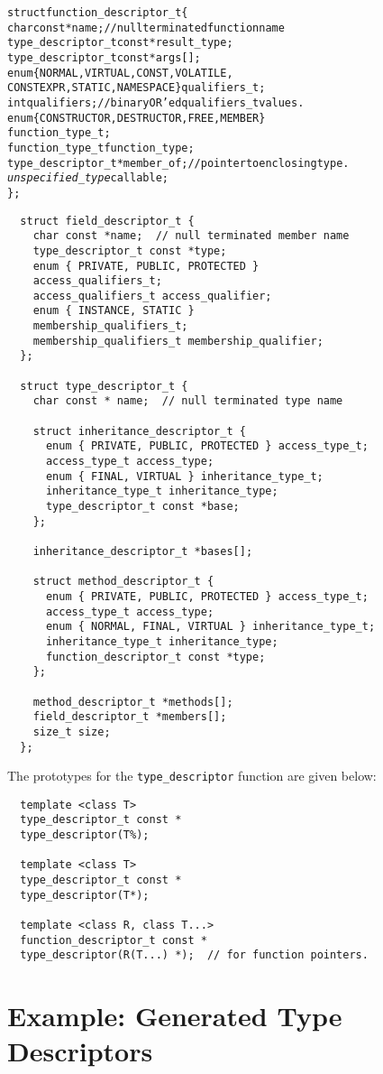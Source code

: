 \documentclass[10pt,a4paper]{article}
\begin{document}
\begin{alltt}
  struct function\_descriptor\_t \{
    char const *name;  // null terminated function name
    type\_descriptor\_t const *result\_type;
    type\_descriptor\_t const *args[];
    enum \{ NORMAL, VIRTUAL, CONST, VOLATILE,
           CONSTEXPR, STATIC, NAMESPACE \} qualifiers\_t;
    int qualifiers;  // binary OR’ed qualifiers\_t values.
    enum \{ CONSTRUCTOR, DESTRUCTOR, FREE, MEMBER \}
    function\_type\_t;
    function\_type\_t function\_type;
    type\_descriptor\_t *member\_of;  // pointer to enclosing type.
    \emph{unspecified\_type} callable;
  \};
\end{alltt}
\begin{verbatim}
  struct field_descriptor_t {
    char const *name;  // null terminated member name
    type_descriptor_t const *type;
    enum { PRIVATE, PUBLIC, PROTECTED }
    access_qualifiers_t;
    access_qualifiers_t access_qualifier;
    enum { INSTANCE, STATIC }
    membership_qualifiers_t;
    membership_qualifiers_t membership_qualifier;
  };

  struct type_descriptor_t {
    char const * name;  // null terminated type name

    struct inheritance_descriptor_t {
      enum { PRIVATE, PUBLIC, PROTECTED } access_type_t;
      access_type_t access_type;
      enum { FINAL, VIRTUAL } inheritance_type_t;
      inheritance_type_t inheritance_type;
      type_descriptor_t const *base;
    };

    inheritance_descriptor_t *bases[];

    struct method_descriptor_t {
      enum { PRIVATE, PUBLIC, PROTECTED } access_type_t;
      access_type_t access_type;
      enum { NORMAL, FINAL, VIRTUAL } inheritance_type_t;
      inheritance_type_t inheritance_type;
      function_descriptor_t const *type;
    };

    method_descriptor_t *methods[];
    field_descriptor_t *members[];
    size_t size;
  };
\end{verbatim}

The prototypes for the \verb+type_descriptor+ function are given below:

\begin{verbatim}
  template <class T>
  type_descriptor_t const *
  type_descriptor(T%);

  template <class T>
  type_descriptor_t const *
  type_descriptor(T*);

  template <class R, class T...>
  function_descriptor_t const *
  type_descriptor(R(T...) *);  // for function pointers.
\end{verbatim}

\section{Example: Generated Type Descriptors}
\label{chap:example-1}

\end{document}
